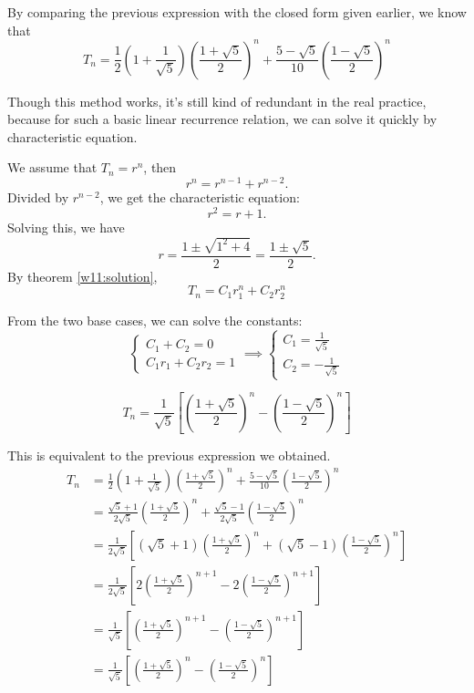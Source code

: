 \documentclass[12pt,a4paper]{article}
\begin{document}
\begin{solution}
By comparing the previous expression with the closed form given earlier, we know that
\[
T_n = \frac{1}{2}\left(1+\frac{1}{\sqrt{5}}\right)\left(\frac{1+\sqrt{5}}{2}\right)^n 
+ \frac{5-\sqrt{5}}{10}\left(\frac{1-\sqrt{5}}{2}\right)^n
\]

\begin{remark}
Though this method works, it's still kind of redundant in the real practice, because for such a basic linear recurrence relation, we can solve it quickly by characteristic equation.

We assume that $T_n = r^n$, then
 \[r^n = r^{n-1} + r^{n-2}.\]
 Divided by $r^{n-2}$, we get the characteristic equation:
  \[r^2 = r + 1.\]
  Solving this, we have
   \[r = \frac{1 \pm \sqrt{1^2 + 4}}{2} = \frac{1 \pm \sqrt{5}}{2}.\]
  By theorem \ref{w11:solution},
  \[T_n = C_1 r_1^n + C_2 r_2^n\]

From the two base cases, we can solve the constants:
\[
\begin{cases}
    C_1 + C_2 = 0\\
    C_1 r_1 + C_2 r_2 = 1
\end{cases}
\implies
\begin{cases}
    C_1 = \frac{1}{\sqrt{5}}\\
    C_2 = -\frac{1}{\sqrt{5}}
\end{cases}
\]

\[
T_n = \frac{1}{\sqrt{5}}\left[\left(\frac{1 + \sqrt{5}}{2}\right)^n - \left(\frac{1 - \sqrt{5}}{2}\right)^n\right]
\]

This is equivalent to the previous expression we obtained.
\begin{align*}
T_n &= \frac{1}{2}\left(1+\frac{1}{\sqrt{5}}\right)\left(\frac{1+\sqrt{5}}{2}\right)^n 
+ \frac{5-\sqrt{5}}{10}\left(\frac{1-\sqrt{5}}{2}\right)^n \\
&= \frac{\sqrt{5}+1}{2\sqrt{5}}\left(\frac{1+\sqrt{5}}{2}\right)^n + \frac{\sqrt{5}-1}{2\sqrt{5}}\left(\frac{1-\sqrt{5}}{2}\right)^n \\
&= \frac{1}{2\sqrt{5}}\left[(\sqrt{5}+1)\left(\frac{1+\sqrt{5}}{2}\right)^n + (\sqrt{5}-1)\left(\frac{1-\sqrt{5}}{2}\right)^n\right] \\
&= \frac{1}{2\sqrt{5}}\left[2\left(\frac{1+\sqrt{5}}{2}\right)^{n+1} - 2\left(\frac{1-\sqrt{5}}{2}\right)^{n+1}\right] \\
&= \frac{1}{\sqrt{5}}\left[\left(\frac{1+\sqrt{5}}{2}\right)^{n+1} - \left(\frac{1-\sqrt{5}}{2}\right)^{n+1}\right] \\
&= \frac{1}{\sqrt{5}}\left[\left(\frac{1 + \sqrt{5}}{2}\right)^n - \left(\frac{1 - \sqrt{5}}{2}\right)^n\right]
\end{align*}


\end{remark}
\end{solution}
\end{document}
